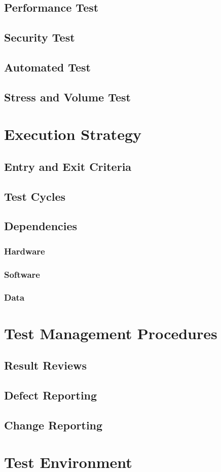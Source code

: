 \documentclass[english]{article}
\begin{document}
		\subsection{Performance Test}
		\subsection{Security Test}
		\subsection{Automated Test}
		\subsection{Stress and Volume Test}
	
	\section{Execution Strategy}
		\subsection{Entry and Exit Criteria}
		\subsection{Test Cycles}
		\subsection{Dependencies}
			\subsubsection{Hardware}
			\subsubsection{Software}
			\subsubsection{Data}
			
	\section{Test Management Procedures}
		\subsection{Result Reviews}
		\subsection{Defect Reporting}
		\subsection{Change Reporting}
		
	\section{Test Environment}
		
\end{document}
